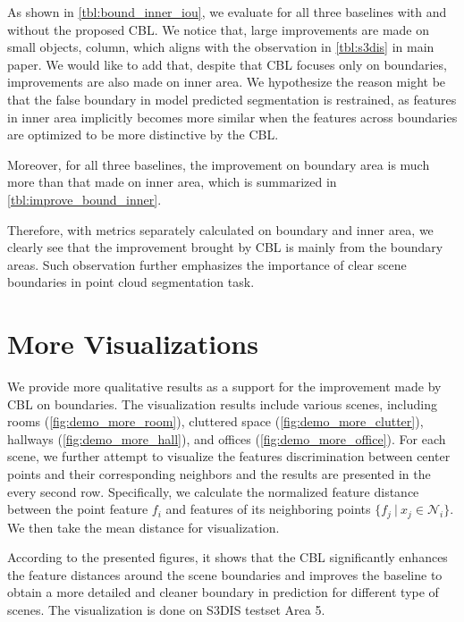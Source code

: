 \documentclass[10pt,twocolumn,letterpaper]{article}
\begin{document}
As shown in \cref{tbl:bound_inner_iou}, we evaluate for all three baselines with and without the proposed CBL.
We notice that, large improvements are made on small objects, \eg column, which aligns with the observation  in \cref{tbl:s3dis} in main paper. We would like to add that, despite that CBL focuses only on boundaries, improvements are also made on inner area. We hypothesize the reason might be that the false boundary in model predicted segmentation is restrained, as features in inner area implicitly becomes more similar when the features across boundaries are optimized to be more distinctive by the CBL.

Moreover, for all three baselines, the improvement on boundary area is much more than that made on inner area, which is summarized in \cref{tbl:improve_bound_inner}.

Therefore, with metrics separately calculated on boundary and inner area, we clearly see that the improvement brought by CBL is mainly from the boundary areas. Such observation further emphasizes the importance of clear scene boundaries in point cloud segmentation task.

\section{More Visualizations}
\label{sec:sup:vis}
We provide more qualitative results as a support for the improvement made by CBL on boundaries.
The visualization results include various scenes, including rooms (\cref{fig:demo_more_room}), cluttered space (\cref{fig:demo_more_clutter}), hallways (\cref{fig:demo_more_hall}), and offices (\cref{fig:demo_more_office}). For each scene, we further attempt to visualize the features discrimination between center points and their corresponding neighbors and the results are presented in the every second row. Specifically, we calculate the normalized feature distance between the point feature $f_i$ and features of its neighboring points $\{ f_j ~|~ x_j\in\mathcal N_i\}$. We then take the mean distance for visualization.

According to the presented figures, it shows that the CBL significantly enhances the feature distances around the scene boundaries and improves the baseline to obtain a more detailed and cleaner boundary in prediction for different type of scenes. The visualization is done on S3DIS testset Area 5.
\end{document}
